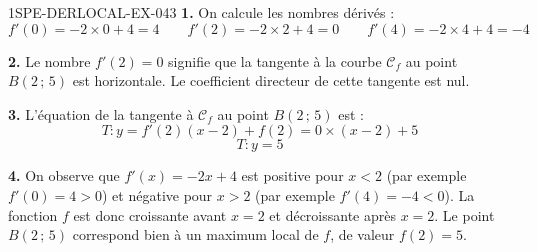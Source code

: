 \begin{corrige}{1SPE-DERLOCAL-EX-043}
\textbf{1.} On calcule les nombres dérivés :
\[
f'(0) = -2 \times 0 + 4 = 4 \qquad f'(2) = -2 \times 2 + 4 = 0 \qquad f'(4) = -2 \times 4 + 4 = -4
\]

\textbf{2.} Le nombre $f'(2) = 0$ signifie que la tangente à la courbe $\mathcal{C}_f$ au point $B(2\,;\,5)$ est horizontale. Le coefficient directeur de cette tangente est nul.

\textbf{3.} L'équation de la tangente à $\mathcal{C}_f$ au point $B(2\,;\,5)$ est :
\[
T : y = f'(2)(x - 2) + f(2) = 0 \times (x - 2) + 5
\]
\[
\boxed{T : y = 5}
\]

\textbf{4.} On observe que $f'(x) = -2x + 4$ est positive pour $x < 2$ (par exemple $f'(0) = 4 > 0$) et négative pour $x > 2$ (par exemple $f'(4) = -4 < 0$). La fonction $f$ est donc croissante avant $x = 2$ et décroissante après $x = 2$. Le point $B(2\,;\,5)$ correspond bien à un maximum local de $f$, de valeur $f(2) = 5$.
\end{corrige}
